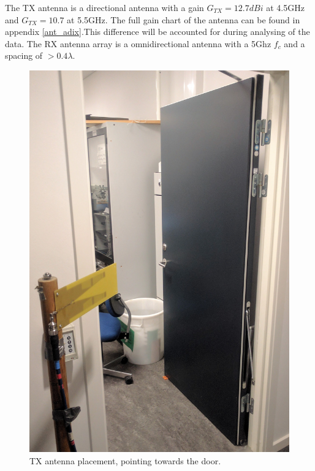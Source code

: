 The TX antenna is a directional antenna with a gain $G_{TX}=12.7dBi$ at 4.5GHz and $G_{TX}=10.7$ at 5.5GHz. The full gain chart of the antenna can be found in appendix \ref{ant_adix}.This difference will be accounted for during analysing of the data. The RX antenna array is a omnidirectional antenna with a 5Ghz $f_c$ and a spacing of $>0.4 \lambda$.

\begin{figure}[H]
  \centering
  \begin{minipage}[H]{0.42\textwidth}
    \includegraphics[width=\textwidth]{pictures/Measurement/antenna_door.jpg}
    \caption{TX antenna placement, pointing towards the door.}
    \label{antennadoor}
  \end{minipage}
  \hfill
  \begin{minipage}[H]{0.4\textwidth}

\end{minipage}
\end{figure}
